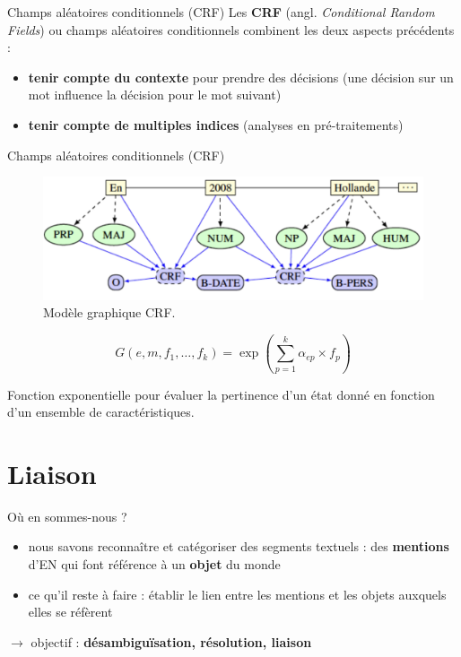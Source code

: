 \documentclass[xetex,xcolor={table,usenames,dvipsnames}]{beamer}
\newcommand{\bolder}[1]{{\color{purple}\bfseries#1}}
\begin{document}
\begin{frame}{Champs aléatoires conditionnels (\textsc{CRF})}
	Les \bolder{\textsc{CRF}} (angl. \textit{Conditional Random Fields}) ou champs aléatoires conditionnels combinent les deux aspects précédents : 
	\begin{itemize}
		\item \textcolor{deepblue}{\textbf{tenir compte du contexte}} pour prendre des décisions (une décision sur un mot influence la décision pour le mot suivant)
		\item \textcolor{deepblue}{\textbf{tenir compte de multiples indices}} (analyses en pré-traitements)
	\end{itemize}
\end{frame}

\begin{frame}{Champs aléatoires conditionnels (\textsc{CRF})}
									\begin{figure}[h] %
		\centering
		\includegraphics[width=.9\linewidth]{img/crf.png}
		\caption{Modèle graphique \textsc{CRF}.}
		\label{fig:ling_out_TAL}
	\end{figure}
	
	\begin{equation*}
			G(e,m,f_{1},\dots,f_{k}) = \exp \left( \sum_{p=1}^{k} \alpha_{ep} \times f_{p} \right)
	\end{equation*}

Fonction exponentielle pour évaluer la pertinence d’un état donné en fonction d’un ensemble de caractéristiques.
	
\end{frame}

\section{Liaison}

\begin{frame}{Où en sommes-nous ?}
	\begin{itemize}
		\item nous savons reconnaître et catégoriser des segments textuels : des \textcolor{deepblue}{\textbf{mentions}} d'\textsc{EN} qui font référence à un \textcolor{deepblue}{\textbf{objet}} du monde
		\item ce qu'il reste à faire : établir le lien entre les mentions et les objets auxquels elles se réfèrent
	\end{itemize}
	
	$\rightarrow$ objectif : \bolder{désambiguïsation, résolution, liaison}
\end{frame}
\end{document}
